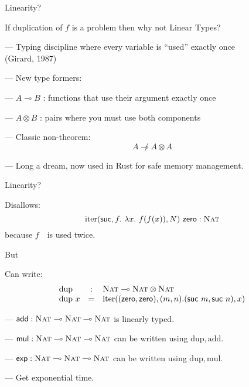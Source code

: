\documentclass[xetex,serif,mathserif,aspectratio=169]{beamer}
\newcommand{\youtem}{\quad \textcolor{titlered!80}{---} \quad}
\newcommand{\HEAD}[1]{\textcolor{titlered}{#1}}
\begin{document}
\begin{frame}
  \HEAD{Linearity?}

  \bigskip

  If duplication of $f$ is a problem then why not Linear Types?

  \bigskip

  \youtem Typing discipline where every variable is ``used'' exactly once \\
  \qquad \qquad \textcolor{black!60}{(Girard, 1987)}

  \medskip

  \youtem New type formers:

  \medskip

  \qquad \youtem $A \multimap B$ : functions that use their argument exactly once

  \qquad \youtem $A \otimes B$ : pairs where you must use both components

  \medskip

  \youtem Classic non-theorem:
  \begin{displaymath}
    A \not\multimap A \otimes A
  \end{displaymath}

  \medskip

  \youtem Long a dream, now used in Rust for safe memory management.

\end{frame}

\begin{frame}

  \HEAD{Linearity?}

  \medskip

  Disallows:
  \begin{displaymath}
    \mathrm{iter}(\mathsf{suc},f.~\lambda x.~f(f(x)),N)~\mathsf{zero} : \textsc{Nat}
  \end{displaymath}
  because $f$~~is used twice.

  \pause

  \bigskip

  \HEAD{But}

  Can write:
  \begin{displaymath}
    \begin{array}{lcl}
      \mathrm{dup} & : & \textsc{Nat} \multimap \textsc{Nat} \otimes \textsc{Nat} \\
      \mathrm{dup}~x  &=&\mathrm{iter}((\mathsf{zero},\mathsf{zero}), (m,n). (\mathsf{suc}~m, \mathsf{suc}~n), x)
    \end{array}
  \end{displaymath}

  \pause
  \youtem $\mathsf{add} : \textsc{Nat} \multimap \textsc{Nat} \multimap \textsc{Nat}$ is linearly typed.

  \pause
  \youtem $\mathsf{mul} : \textsc{Nat} \multimap \textsc{Nat} \multimap \textsc{Nat}$ can be written using $\mathrm{dup}, \mathrm{add}$.

  \pause
  \youtem $\mathsf{exp} : \textsc{Nat} \multimap \textsc{Nat} \multimap \textsc{Nat}$ can be written using $\mathrm{dup}, \mathrm{mul}$.

  \pause
  \youtem Get exponential time.

\end{frame}
\end{document}
